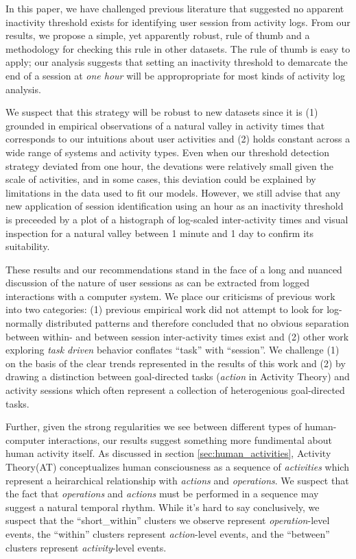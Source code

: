 In this paper, we have challenged previous literature that suggested no apparent inactivity threshold exists for identifying user session from activity logs.  From our results, we propose a simple, yet apparently robust, rule of thumb and a methodology for checking this rule in other datasets.  The rule of thumb is easy to apply; our analysis suggests that setting an inactivity threshold to demarcate the end of a session at \emph{one hour} will be appropropriate for most kinds of activity log analysis.

We suspect that this strategy will be robust to new datasets since it is (1) grounded in empirical observations of a natural valley in activity times that corresponds to our intuitions about user activities and (2) holds constant across a wide range of systems and activity types. Even when our threshold detection strategy deviated from one hour, the devations were relatively small given the scale of activities, and in some cases, this deviation could be explained by limitations in the data used to fit our models.  However, we still advise that any new application of session identification using an hour as an inactivity threshold is preceeded by a plot of a histograph of log-scaled inter-activity times and visual inspection for a natural valley between 1 minute and 1 day to confirm its suitability.

These results and our recommendations stand in the face of a long and nuanced discussion of the nature of user sessions as can be extracted from logged interactions with a computer system.  We place our criticisms of previous work into two categories: (1) previous empirical work did not attempt to look for log-normally distributed patterns and therefore concluded that no obvious separation between within- and between session inter-activity times exist\cite{mehrzadi2012onextracting}\cite{catledge1995characterizing} and (2) other work exploring \emph{task driven} behavior conflates ``task'' with ``session''.  We challenge (1) on the basis of the clear trends represented in the results of this work and (2) by drawing a distinction between goal-directed tasks (\emph{action} in Activity Theory) and activity sessions which often represent a collection of heterogenious goal-directed tasks.

Further, given the strong regularities we see between different types of human-computer interactions, our results suggest something more fundimental about human activity itself.  As discussed in section \ref{sec:human_activities}, Activity Theory(AT) conceptualizes human consciousness as a sequence of \emph{activities} which represent a heirarchical relationship with \emph{actions} and \emph{operations}.  We suspect that the fact that \emph{operations} and \emph{actions} must be performed in a sequence may suggest a natural temporal rhythm.  While it's hard to say conclusively, we suspect that the ``short\_within'' clusters we observe represent \emph{operation}-level events, the ``within'' clusters represent \emph{action}-level events, and the ``between'' clusters represent \emph{activity}-level events.

